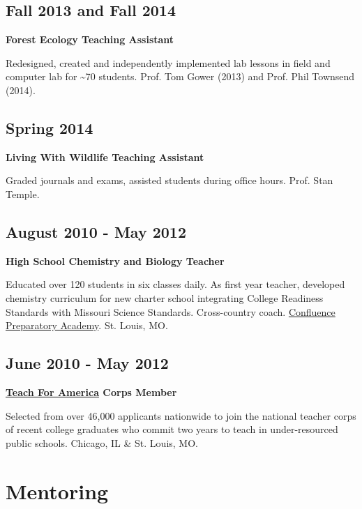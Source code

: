 \documentclass[11pt, sans]{moderncv}
\begin{document}
\subsection*{Fall 2013 and Fall 2014}
\label{sec:org81dd3e9}
\textbf{Forest Ecology Teaching Assistant}

Redesigned, created and independently implemented lab lessons in field and computer lab for \textasciitilde{}70
students.  Prof. Tom Gower (2013) and Prof. Phil Townsend (2014).

\subsection*{Spring 2014}
\label{sec:orga2d5c92}
\textbf{Living With Wildlife Teaching Assistant}

Graded journals and exams, assisted students during office hours.
Prof. Stan Temple.

\subsection*{August 2010 - May 2012}
\label{sec:orgaf1ec3b}
\textbf{High School Chemistry and Biology Teacher}

Educated over 120 students in six classes daily. As first year
teacher, developed chemistry curriculum for new charter school
integrating College Readiness Standards with Missouri Science
Standards. Cross-country coach. \href{https://www.google.com/search?q=Confluence+Preparatory+Academy+St.+Louis\&oq=Confluence+Prep+Academy+St.+Louis\&aqs=chrome..69i57.7294j0j8\&sourceid=chrome\&ie=UTF-8\#q=Confluence+Prep+Academy+High+School+St.+Louis}{Confluence Preparatory Academy}. St. Louis, MO.

\subsection*{June 2010 - May 2012}
\label{sec:orgb957b67}
\textbf{\href{https://www.teachforamerica.org/}{Teach For America} Corps Member}

Selected from over 46,000 applicants nationwide to join the national
teacher corps of recent college graduates who commit two years to
teach in under-resourced public schools.  Chicago, IL \& St. Louis, MO.

\section*{Mentoring}
\label{sec:org08edd7c}
\end{document}

